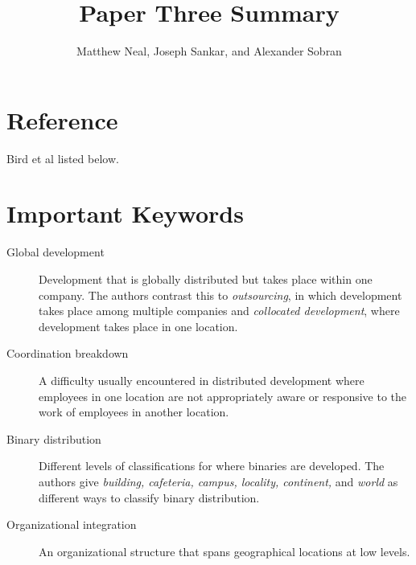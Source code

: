 \documentclass[english]{article}
\begin{document}
\title{Paper Three Summary}


\author{Matthew Neal, Joseph Sankar, and Alexander Sobran}

\maketitle

\section*{Reference}

Bird et al \cite{bird09} listed below.


\section*{Important Keywords}
\begin{description}
\item [{Global development}] Development that is globally distributed but takes place within one company. The authors contrast this to \emph{outsourcing}, in which development takes place among multiple companies and \emph{collocated development}, where development takes place in one location. 
\item [{Coordination breakdown}] A difficulty usually encountered in distributed development where employees in one location are not appropriately aware or responsive to the work of employees in another location.
\item [{Binary distribution}] Different levels of classifications for where binaries are developed. The authors give \emph{building, cafeteria, campus, locality, continent, } and \emph{world} as different ways to classify binary distribution.
\item [{Organizational integration}] An organizational structure that spans geographical locations at low levels.
\end{description}
\end{document}
